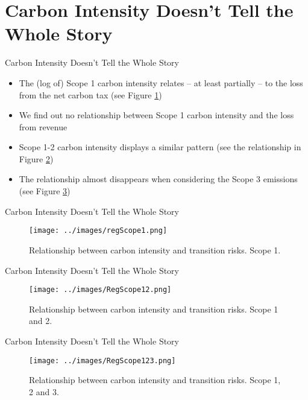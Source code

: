 \documentclass{beamer}
\begin{document}
\section{Carbon Intensity Doesn't Tell the Whole Story}


\begin{frame}{Carbon Intensity Doesn't Tell the Whole Story}
  \begin{itemize}
    \item The (log of) Scope 1 carbon intensity relates – at least partially – to the loss from the net carbon tax (see Figure \ref{fig:regScope1})
    \item We find out no relationship between Scope 1 carbon intensity and the loss from revenue
    \item Scope 1-2 carbon intensity displays a similar pattern (see the relationship in Figure \ref{fig:regScope12})
    \item The relationship almost disappears when considering the Scope 3 emissions (see Figure \ref{fig:regScope123})
  \end{itemize}
\end{frame}


\begin{frame}{Carbon Intensity Doesn't Tell the Whole Story}
  \begin{figure}
    \centering
    \texttt{[image: ../images/regScope1.png]}
    \caption{Relationship between carbon intensity and transition risks. Scope 1.}
    \label{fig:regScope1}
  \end{figure}

\end{frame}

\begin{frame}{Carbon Intensity Doesn't Tell the Whole Story}
  \begin{figure}
    \centering
    \texttt{[image: ../images/RegScope12.png]}
    \caption{Relationship between carbon intensity and transition risks. Scope 1 and 2.}
    \label{fig:regScope12}
  \end{figure}

\end{frame}


\begin{frame}{Carbon Intensity Doesn't Tell the Whole Story}
  \begin{figure}
    \centering
    \texttt{[image: ../images/RegScope123.png]}
    \caption{Relationship between carbon intensity and transition risks. Scope 1, 2 and 3.}
    \label{fig:regScope123}
  \end{figure}

\end{frame}
\end{document}
